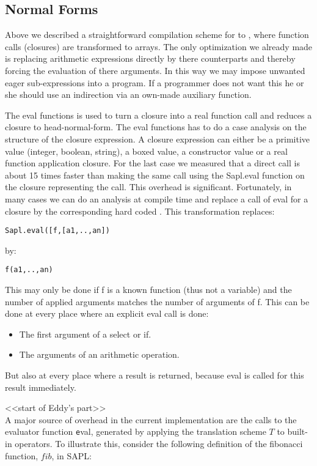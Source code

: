 \subsection{Normal Forms}
Above we described a straightforward compilation scheme for \Sapl to \JS, where function calls (closures) are transformed to arrays.
The only optimization we already made is replacing arithmetic expressions directly by there \JS counterparts 
and thereby forcing the evaluation of there arguments. 
In this way we may impose unwanted eager sub-expressions into a program. 
If a programmer does not want this he or she should use an indirection via an own-made auxiliary function.

The \textsf{eval} functions is used to turn a closure into a real \JS function call and reduces a closure to head-normal-form.
The \textsf{eval} functions has to do a case analysis on the structure of the closure expression.
A closure expression can either be a primitive value (integer, boolean, string), a boxed value, a constructor value or a real function application closure.
For the last case we measured that a direct \JS call is about 15 times faster than making the same call using the 
\textsf{Sapl.eval} function on the closure representing the call. This overhead is significant. 
Fortunately, in many cases we can do an analysis at compile time and replace a call of \textsf{eval} for a closure by the corresponding hard coded \JS.
This transformation replaces:
\begin{verbatim}
Sapl.eval([f,[a1,..,an])
\end{verbatim}
by:
\begin{verbatim}
f(a1,..,an)
\end{verbatim}
This may only be done if \textsf{f} is a known function (thus not a variable) and the number of applied arguments matches the
number of arguments of \textsf{f}.
This can be done at every place where an explicit \textsf{eval} call is done:
\begin{itemize}
\item The first argument of a \textsf{select} or \textsf{if}.
\item The arguments of an arithmetic operation.
\end{itemize}
But also at every place where a result is returned, because \textsf{eval} is called for this result immediately.

<<start of Eddy's part>>\\
A major source of overhead in the current implementation are the calls to the
evaluator function {\texttt eval}, generated by applying the translation scheme
$T$ to built-in operators. To illustrate this, consider the following definition
of the fibonacci function, $fib$, in SAPL:

